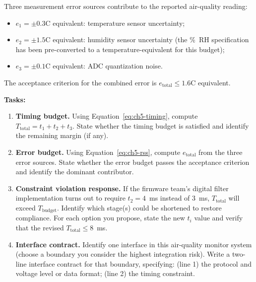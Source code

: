 Three measurement error sources contribute to the reported air-quality reading:
\begin{itemize}
  \item $e_1 = \pm 0.3$\textdegree{}C equivalent: temperature sensor uncertainty;
  \item $e_2 = \pm 1.5$\textdegree{}C equivalent: humidity sensor uncertainty (the \%~RH specification has been pre-converted to a temperature-equivalent for this budget);
  \item $e_3 = \pm 0.1$\textdegree{}C equivalent: ADC quantization noise.
\end{itemize}

The acceptance criterion for the combined error is $e_{\text{total}} \leq 1.6$\textdegree{}C equivalent.

\bigskip
\noindent\textbf{Tasks:}

\begin{enumerate}
  \item[(a)] \textbf{Timing budget.}
        Using Equation~\ref{eq:ch5-timing}, compute $T_{\text{total}} = t_1 + t_2 + t_3$.
        State whether the timing budget is satisfied and identify the remaining margin (if any).

  \item[(b)] \textbf{Error budget.}
        Using Equation~\ref{eq:ch5-rss}, compute $e_{\text{total}}$ from the three error sources.
        State whether the error budget passes the acceptance criterion and identify the dominant contributor.

  \item[(c)] \textbf{Constraint violation response.}
        If the firmware team's digital filter implementation turns out to require $t_2 = 4$~ms instead of 3~ms, $T_{\text{total}}$ will exceed $T_{\text{budget}}$.
        Identify which stage(s) could be shortened to restore compliance.
        For each option you propose, state the new $t_i$ value and verify that the revised $T_{\text{total}} \leq 8$~ms.

  \item[(d)] \textbf{Interface contract.}
        Identify one interface in this air-quality monitor system (choose a boundary you consider the highest integration risk).
        Write a two-line interface contract for that boundary, specifying: (line 1) the protocol and voltage level or data format; (line 2) the timing constraint.
\end{enumerate}

